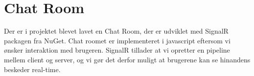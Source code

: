\section{Chat Room}
Der er i projektet blevet lavet en Chat Room, der er udviklet med SignalR packagen fra NuGet. Chat roomet er implementeret i javascript eftersom vi ønsker interaktion med brugeren. SignalR tillader at vi opretter en pipeline mellem client og server, og vi gør det derfor muligt at brugerene kan se hinandens beskeder real-time.
